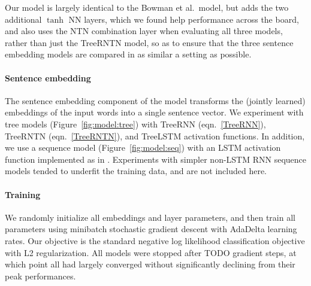 Our model is largely identical to the Bowman et al.~model, but adds the two additional $\tanh$ NN layers, which we found help performance across the board, and also uses the NTN combination layer when evaluating all three models, rather than just the TreeRNTN model, so as to ensure that the three sentence embedding models are compared in as similar a setting as possible.

\paragraph{Sentence embedding}
The sentence embedding component of the model transforms the (jointly learned) embeddings of the input words into a single sentence vector. We experiment with tree models (Figure~\ref{fig:model:tree}) with TreeRNN (eqn.~\ref{TreeRNN}), TreeRNTN (eqn.~\ref{TreeRNTN}), and TreeLSTM \cite{tai2015improved} activation functions. In addition, we use a sequence model (Figure~\ref{fig:model:seq}) with an LSTM activation function \cite{hochreiter1997long} implemented as in . Experiments with simpler non-LSTM RNN sequence models tended to underfit the training data, and are not included here.

\paragraph{Training} We randomly initialize all embeddings and layer parameters, and then train all parameters using minibatch stochastic gradient descent with AdaDelta \cite{zeiler2012adadelta} learning rates. Our objective is the standard negative log likelihood classification objective with L2 regularization. All models were stopped after TODO gradient steps, at which point all had largely converged without significantly declining from their peak performances.
